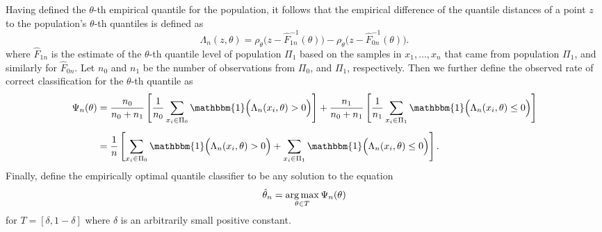 Having defined the $\theta$-th empirical quantile for the population, it follows
that the empirical difference of the quantile distances of a point $z$ to the
population's $\theta$-th quantiles is defined as
\[
  \Lambda_n (z, \theta) = \rho_{\theta}\Big(z - \hat{F}_{1n}^{-1}(\theta)\Big) -
  \rho_{\theta}\Big(z - \hat{F}_{0n}^{-1}(\theta)\Big).
\]
where $\hat{F}_{1n}$ is the estimate of the $\theta$-th quantile level of
population $\Pi_1$ based on the samples in $x_1, \dots, x_n$ that came from
population $\Pi_1$, and similarly for $\hat{F}_{0n}$.  Let $n_0$ and $n_1$
be the number of observations from $\Pi_0$, and $\Pi_1$, respectively.  Then we
further define the observed rate of correct classification for the $\theta$-th
quantile as
\begin{align}
  \begin{split}
    \Psi_n(\theta)
    &= \frac{n_0}{n_0 + n_1} \left[
      \frac{1}{n_0} \sum_{x_i \in \Pi_0}
      \mathbbm{1}\Big( \Lambda_n(x_i, \theta) > 0 \Big)
    \right] +
      \frac{n_1}{n_0 + n_1} \left[
        \frac{1}{n_1} \sum_{x_i \in \Pi_1}
        \mathbbm{1}\Big( \Lambda_n(x_i, \theta) \leq 0 \Big)
      \right] \\[1ex]
    &= \frac{1}{n} \left[
      \sum_{x_i \in \Pi_0} \mathbbm{1}\Big( \Lambda_n(x_i, \theta) > 0 \Big) +
      \sum_{x_i \in \Pi_1} \mathbbm{1}\Big( \Lambda_n(x_i, \theta) \leq 0 \Big)
    \right].
  \end{split}
\end{align}
Finally, define the empirically optimal quantile classifier to be any solution
to the equation
\begin{equation}
  \hat{\theta}_n = \operatorname*{arg\,max}_{\theta \in T} \Psi_n(\theta)
\end{equation}
for $T = [ \delta, 1 - \delta]$ where $\delta$ is an arbitrarily small positive
constant.




